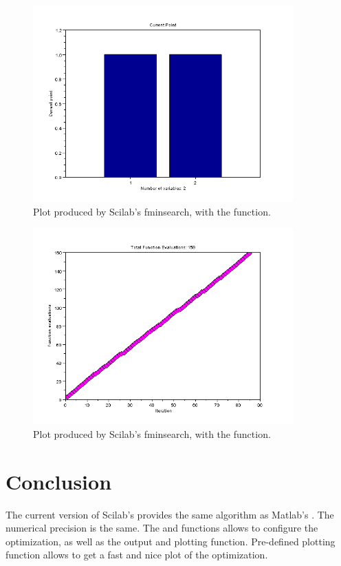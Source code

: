 \begin{figure}
\begin{center}
\includegraphics[width=10cm]{testFminsearchOptimplotxScilab.png}
\end{center}
\caption{Plot produced by Scilab's fminsearch, with the  function.}
\label{fig-fminsearch-scilab-optimplotx}
\end{figure}

\begin{figure}
\begin{center}
\includegraphics[width=10cm]{testFminsearchOptimplotfunccountScilab.png}
\end{center}
\caption{Plot produced by Scilab's fminsearch, with the  function.}
\label{fig-fminsearch-scilab-optimplotfunccount}
\end{figure}

\section{Conclusion}

The current version of Scilab's  provides the same algorithm
as Matlab's . The numerical precision is the same.
The  and  functions allows to configure the optimization, 
as well as the output and plotting function.
Pre-defined plotting function allows to get a fast and nice plot of the optimization.


